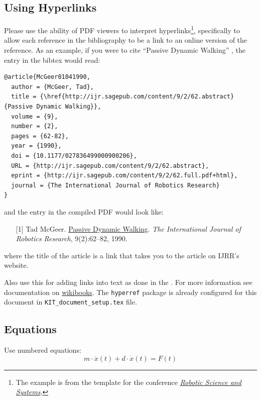 \subsection{Using Hyperlinks}
Please use the ability of PDF viewers to interpret hyperlinks\footnote{The example is from the template for the conference \href{http://www.roboticsconference.org/information/authorinfo/}{\textit{Robotic Science and Systems}}.}, specifically to allow each reference in the bibliography to be a
link to an online version of the reference.
As an example, if you were to cite ``Passive Dynamic Walking''
\cite{McGeer01041990}, the entry in the bibtex would read:

{\tiny
\begin{verbatim}
@article{McGeer01041990,
  author = {McGeer, Tad},
  title = {\href{http://ijr.sagepub.com/content/9/2/62.abstract}{Passive Dynamic Walking}},
  volume = {9},
  number = {2},
  pages = {62-82},
  year = {1990},
  doi = {10.1177/027836499000900206},
  URL = {http://ijr.sagepub.com/content/9/2/62.abstract},
  eprint = {http://ijr.sagepub.com/content/9/2/62.full.pdf+html},
  journal = {The International Journal of Robotics Research}
}
\end{verbatim}
}
\noindent
and the entry in the compiled PDF would look like:

\def\tmplabel#1{[#1]}

\begin{enumerate}
\item[\tmplabel{1}] Tad McGeer. \href{http://ijr.sagepub.com/content/9/2/62.abstract}{Passive Dynamic
Walking}. {\em The International Journal of Robotics Research}, 9(2):62--82,
1990.
\end{enumerate}
%
where the title of the article is a link that takes you to the article on IJRR's website.


Also use this for adding links into text as done in the \footnotemark[2]. For more information see documentation on \href{https://de.wikibooks.org/wiki/LaTeX-W%C3%B6rterbuch:_hyperref}{wikibooks}. The \texttt{hyperref} package is already configured for this document in \texttt{KIT\_document\_setup.tex} file.


\subsection{Equations}
Use numbered equations:
\begin{equation} \label{equ:equ}
  m \cdot \ddot{x}(t) + d \cdot \dot{x}(t) = F(t)
\end{equation}


